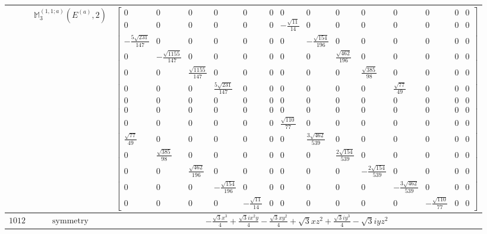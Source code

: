 \documentclass[fleqn,8pt,landscape]{jsarticle}
\begin{document}
\begin{longtable}{ccc}
$  $ & $ \mathbb{M}_{3}^{(1,1;a)}(E^{(a)},2) $ & $ \begin{bmatrix} 0 & 0 & 0 & 0 & 0 & 0 & 0 & 0 & 0 & 0 & 0 & 0 & 0 & 0 \\ 0 & 0 & 0 & 0 & 0 & 0 & - \frac{\sqrt{11}}{14} & 0 & 0 & 0 & 0 & 0 & 0 & 0 \\ - \frac{5 \sqrt{231}}{147} & 0 & 0 & 0 & 0 & 0 & 0 & - \frac{\sqrt{154}}{196} & 0 & 0 & 0 & 0 & 0 & 0 \\ 0 & - \frac{\sqrt{1155}}{147} & 0 & 0 & 0 & 0 & 0 & 0 & \frac{\sqrt{462}}{196} & 0 & 0 & 0 & 0 & 0 \\ 0 & 0 & \frac{\sqrt{1155}}{147} & 0 & 0 & 0 & 0 & 0 & 0 & \frac{\sqrt{385}}{98} & 0 & 0 & 0 & 0 \\ 0 & 0 & 0 & \frac{5 \sqrt{231}}{147} & 0 & 0 & 0 & 0 & 0 & 0 & \frac{\sqrt{77}}{49} & 0 & 0 & 0 \\ 0 & 0 & 0 & 0 & 0 & 0 & 0 & 0 & 0 & 0 & 0 & 0 & 0 & 0 \\ 0 & 0 & 0 & 0 & 0 & 0 & 0 & 0 & 0 & 0 & 0 & 0 & 0 & 0 \\ 0 & 0 & 0 & 0 & 0 & 0 & \frac{\sqrt{110}}{77} & 0 & 0 & 0 & 0 & 0 & 0 & 0 \\ \frac{\sqrt{77}}{49} & 0 & 0 & 0 & 0 & 0 & 0 & \frac{3 \sqrt{462}}{539} & 0 & 0 & 0 & 0 & 0 & 0 \\ 0 & \frac{\sqrt{385}}{98} & 0 & 0 & 0 & 0 & 0 & 0 & \frac{2 \sqrt{154}}{539} & 0 & 0 & 0 & 0 & 0 \\ 0 & 0 & \frac{\sqrt{462}}{196} & 0 & 0 & 0 & 0 & 0 & 0 & - \frac{2 \sqrt{154}}{539} & 0 & 0 & 0 & 0 \\ 0 & 0 & 0 & - \frac{\sqrt{154}}{196} & 0 & 0 & 0 & 0 & 0 & 0 & - \frac{3 \sqrt{462}}{539} & 0 & 0 & 0 \\ 0 & 0 & 0 & 0 & - \frac{\sqrt{11}}{14} & 0 & 0 & 0 & 0 & 0 & 0 & - \frac{\sqrt{110}}{77} & 0 & 0 \end{bmatrix} $ \\ \hline
$ 1012 $ & $ \text{symmetry} $ & $ - \frac{\sqrt{3} x^{3}}{4} + \frac{\sqrt{3} i x^{2} y}{4} - \frac{\sqrt{3} x y^{2}}{4} + \sqrt{3} x z^{2} + \frac{\sqrt{3} i y^{3}}{4} - \sqrt{3} i y z^{2} $ \\

\end{longtable}
\end{document}
